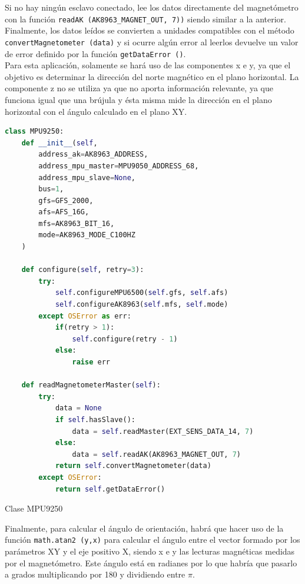 Si no hay ningún esclavo conectado, lee los datos directamente del magnetómetro con la función \verb|readAK (AK8963_MAGNET_OUT, 7))| siendo similar a la anterior. Finalmente, los datos leídos se convierten a unidades compatibles con el método \verb|convertMagnetometer (data)| y si ocurre algún error al leerlos devuelve un valor de error definido por la función \verb|getDataError ()|.\\

Para esta aplicación, solamente se hará uso de las componentes x e y, ya que el objetivo es determinar la dirección del norte magnético en el plano horizontal. La componente z no se utiliza ya que no aporta información relevante, ya que funciona igual que una brújula y ésta misma mide la dirección en el plano horizontal con el ángulo calculado en el plano XY.


\begin{code}[H]
\begin{lstlisting}[language=Python]
class MPU9250:
    def __init__(self, 
        address_ak=AK8963_ADDRESS, 
        address_mpu_master=MPU9050_ADDRESS_68, 
        address_mpu_slave=None, 
        bus=1, 
        gfs=GFS_2000, 
        afs=AFS_16G, 
        mfs=AK8963_BIT_16, 
        mode=AK8963_MODE_C100HZ
    )
       
    def configure(self, retry=3):
        try:
            self.configureMPU6500(self.gfs, self.afs)
            self.configureAK8963(self.mfs, self.mode)
        except OSError as err:
            if(retry > 1):
                self.configure(retry - 1)
            else:
                raise err
     
    def readMagnetometerMaster(self):
        try:
            data = None
            if self.hasSlave():
                data = self.readMaster(EXT_SENS_DATA_14, 7)          
            else:   
                data = self.readAK(AK8963_MAGNET_OUT, 7)
            return self.convertMagnetometer(data)
        except OSError:
            return self.getDataError()           
\end{lstlisting}
\caption[Clase MPU9250]{Clase MPU9250}
\label{cod:codejemplo}
\end{code}


Finalmente, para calcular el ángulo de orientación, habrá que hacer uso de la función \verb|math.atan2 (y,x)| para calcular el ángulo entre el vector formado por los parámetros XY y el eje positivo X, siendo x e y las lecturas magnéticas medidas por el magnetómetro. Este ángulo está en radianes por lo que habría que pasarlo a grados multiplicando por 180 y dividiendo entre \(\pi\).\\

